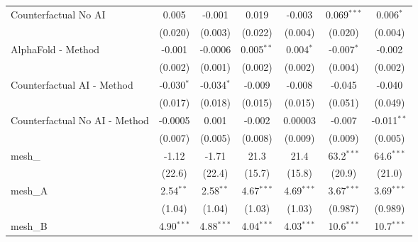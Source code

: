 \begin{tabular}{lcccccc}
   Counterfactual No AI                                        & 0.005          & -0.001         & 0.019         & -0.003        & 0.069$^{***}$ & 0.006$^{*}$\\   
                                                               & (0.020)        & (0.003)        & (0.022)       & (0.004)       & (0.020)       & (0.004)\\   
   AlphaFold - Method                                          & -0.001         & -0.0006        & 0.005$^{**}$  & 0.004$^{*}$   & -0.007$^{*}$  & -0.002\\   
                                                               & (0.002)        & (0.001)        & (0.002)       & (0.002)       & (0.004)       & (0.002)\\   
   Counterfactual AI - Method                                  & -0.030$^{*}$   & -0.034$^{*}$   & -0.009        & -0.008        & -0.045        & -0.040\\   
                                                               & (0.017)        & (0.018)        & (0.015)       & (0.015)       & (0.051)       & (0.049)\\   
   Counterfactual No AI - Method                               & -0.0005        & 0.001          & -0.002        & 0.00003       & -0.007        & -0.011$^{**}$\\   
                                                               & (0.007)        & (0.005)        & (0.008)       & (0.009)       & (0.009)       & (0.005)\\   
   mesh\_                                                      & -1.12          & -1.71          & 21.3          & 21.4          & 63.2$^{***}$  & 64.6$^{***}$\\   
                                                               & (22.6)         & (22.4)         & (15.7)        & (15.8)        & (20.9)        & (21.0)\\   
   mesh\_A                                                     & 2.54$^{**}$    & 2.58$^{**}$    & 4.67$^{***}$  & 4.69$^{***}$  & 3.67$^{***}$  & 3.69$^{***}$\\   
                                                               & (1.04)         & (1.04)         & (1.03)        & (1.03)        & (0.987)       & (0.989)\\   
   mesh\_B                                                     & 4.90$^{***}$   & 4.88$^{***}$   & 4.04$^{***}$  & 4.03$^{***}$  & 10.6$^{***}$  & 10.7$^{***}$\\   

\end{tabular}
